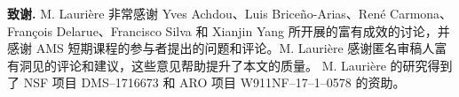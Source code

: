 \documentclass{amsproc}
\theoremstyle{definition}
\theoremstyle{remark}
\numberwithin{equation}{section}
\begin{document}
\vskip 6pt
\noindent \textbf{致谢. } M. Lauri{\`e}re 非常感谢 Yves Achdou、Luis Brice\~{n}o-Arias、Ren\'e Carmona、Fran{\c c}ois Delarue、Francisco Silva 和 Xianjin Yang 所开展的富有成效的讨论，并感谢 AMS 短期课程的参与者提出的问题和评论。M. Lauri{\`e}re 感谢匿名审稿人富有洞见的评论和建议，这些意见帮助提升了本文的质量。
M. Lauri\`ere 的研究得到了 NSF 项目 DMS--1716673 和 ARO 项目 W911NF--17--1--0578 的资助。










\printindex
\end{document}
